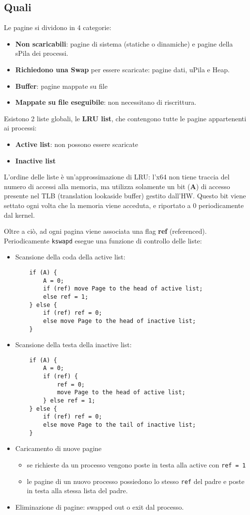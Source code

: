 \documentclass[12pt, a4paper]{report}
\begin{document}
\subsection{Quali}
Le pagine si dividono in 4 categorie:
\begin{itemize}
	\item \textbf{Non scaricabili}: pagine di sistema (statiche o dinamiche) e
		pagine della sPila dei processi.
	\item \textbf{Richiedono una Swap} per essere scaricate: pagine dati, uPila
		e Heap.
	\item \textbf{Buffer}: pagine mappate su file
	\item \textbf{Mappate su file eseguibile}: non necessitano di riscrittura.
\end{itemize}
Esistono 2 liste globali, le \textbf{LRU list}, che contengono tutte le pagine
appartenenti ai processi:
\begin{itemize}
	\item \textbf{Active list}: non possono essere scaricate
	\item \textbf{Inactive list}
\end{itemize}
L'ordine delle liste è un'approssimazione di LRU: l'x64 non tiene traccia del
numero di accessi alla memoria, ma utilizza solamente un bit (\textbf{A}) di
accesso presente nel TLB (translation lookaside buffer) gestito dall'HW. Questo
bit viene settato ogni volta che la memoria viene acceduta, e riportato a 0
periodicamente dal kernel.

Oltre a ciò, ad ogni pagina viene associata una flag \textbf{ref} (referenced).
Periodicamente \texttt{kswapd} esegue una funzione di controllo delle liste:
\begin{itemize}
	\item Scansione della coda della active list:
        \begin{verbatim}
    if (A) {
        A = 0;
        if (ref) move Page to the head of active list;
        else ref = 1;
    } else {
        if (ref) ref = 0;
        else move Page to the head of inactive list;
    }
        \end{verbatim}
	\item Scansione della testa della inactive list:
        \begin{verbatim}
    if (A) {
        A = 0;
        if (ref) {
            ref = 0;
            move Page to the head of active list;
        } else ref = 1;
    } else {
        if (ref) ref = 0;
        else move Page to the tail of inactive list;
    }
        \end{verbatim}
	\item Caricamento di nuove pagine
		\begin{itemize}
			\item se richieste da un processo vengono poste in testa alla active
				con \texttt{ref = 1}
			\item le pagine di un nuovo processo possiedono lo stesso
				\texttt{ref} del padre e poste in testa alla stessa lista del
				padre.
		\end{itemize}
	\item Eliminazione di pagine: swapped out o exit dal processo.
\end{itemize}
\end{document}
